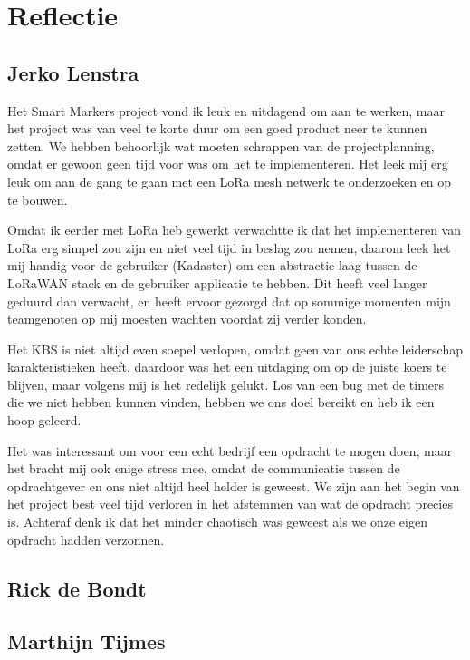 \section{Reflectie}

\subsection{Jerko Lenstra}
Het Smart Markers project vond ik leuk en uitdagend om aan te werken, maar het
project was van veel te korte duur om een goed product neer te kunnen zetten.
We hebben behoorlijk wat moeten schrappen van de projectplanning, omdat er gewoon
geen tijd voor was om het te implementeren. Het leek mij erg leuk om aan de gang
te gaan met een LoRa mesh netwerk te onderzoeken en op te bouwen.

Omdat ik eerder met LoRa heb gewerkt verwachtte ik dat het implementeren van LoRa
erg simpel zou zijn en niet veel tijd in beslag zou nemen, daarom leek het mij
handig voor de gebruiker (Kadaster) om een abstractie laag tussen de LoRaWAN stack
en de gebruiker applicatie te hebben. Dit heeft veel langer geduurd dan verwacht,
en heeft ervoor gezorgd dat op sommige momenten mijn teamgenoten op mij moesten
wachten voordat zij verder konden.

Het KBS is niet altijd even soepel verlopen, omdat geen van ons echte leiderschap
karakteristieken heeft, daardoor was het een uitdaging om op de juiste koers te
blijven, maar volgens mij is het redelijk gelukt. Los van een bug met de timers
die we niet hebben kunnen vinden, hebben we ons doel bereikt en heb ik een hoop
geleerd.

Het was interessant om voor een echt bedrijf een opdracht te mogen doen, maar het
bracht mij ook enige stress mee, omdat de communicatie tussen de opdrachtgever en
ons niet altijd heel helder is geweest. We zijn aan het begin van het project best
veel tijd verloren in het afstemmen van wat de opdracht precies is. Achteraf denk
ik dat het minder chaotisch was geweest als we onze eigen opdracht hadden verzonnen.

\subsection{Rick de Bondt}


\subsection{Marthijn Tijmes}
